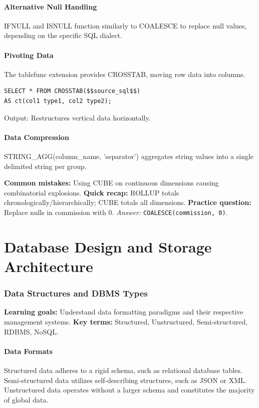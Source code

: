 \documentclass[12pt, a4paper]{article}
\begin{document}
\subsection{Alternative Null Handling}
IFNULL and ISNULL function similarly to COALESCE to replace null values, depending on the specific SQL dialect.

\subsection{Pivoting Data}
The tablefunc extension provides CROSSTAB, moving row data into columns.

\begin{verbatim}
SELECT * FROM CROSSTAB($$source_sql$$) 
AS ct(col1 type1, col2 type2);
\end{verbatim}
Output: Restructures vertical data horizontally.

\subsection{Data Compression}
STRING\_AGG(column\_name, 'separator') aggregates string values into a single delimited string per group.

\textbf{Common mistakes:} Using CUBE on continuous dimensions causing combinatorial explosions.
\textbf{Quick recap:} ROLLUP totals chronologically/hierarchically; CUBE totals all dimensions.
\textbf{Practice question:} Replace nulls in commission with 0.
\textit{Answer:} \texttt{COALESCE(commission, 0)}.

\part{Database Design and Storage Architecture}

\section{Data Structures and DBMS Types}
\textbf{Learning goals:} Understand data formatting paradigms and their respective management systems.
\textbf{Key terms:} Structured, Unstructured, Semi-structured, RDBMS, NoSQL.

\subsection{Data Formats}
Structured data adheres to a rigid schema, such as relational database tables.
Semi-structured data utilizes self-describing structures, such as JSON or XML.
Unstructured data operates without a larger schema and constitutes the majority of global data.
\end{document}
